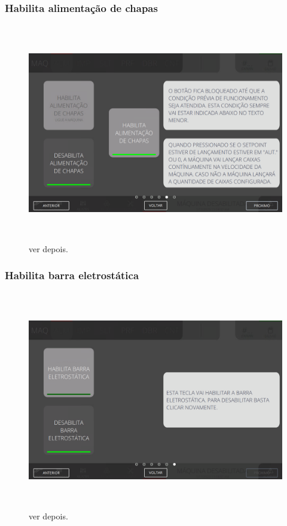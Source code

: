 \newpage
\thispagestyle{fancy}
\vspace*{\fill}
\subsubsection{\small{Habilita alimentação de chapas}}
\begin{figure}[h]
  \centering
  \includegraphics[width=576px,height=360px]{src/images/03-feeder/commands/e-5.png}
  \caption{ver depois.}
   \label{}
\end{figure}
\vspace*{\fill}

\newpage
\thispagestyle{fancy}
\vspace*{\fill}
\subsubsection{\small{Habilita barra eletrostática}}
\begin{figure}[h]
  \centering
  \includegraphics[width=576px,height=360px]{src/images/03-feeder/commands/e-6.png}
  \caption{ver depois.}
   \label{}
\end{figure}
\vspace*{\fill}